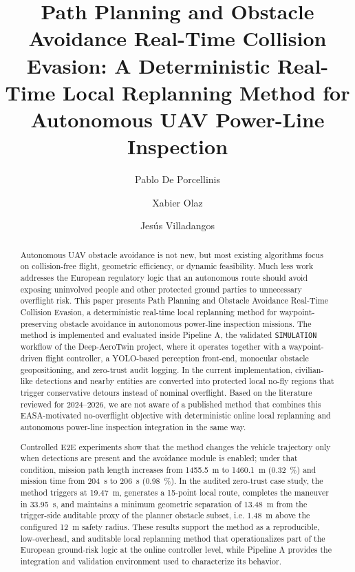 \documentclass[a4paper,11pt]{article}
\title{Path Planning and Obstacle Avoidance Real-Time Collision Evasion: A Deterministic Real-Time Local Replanning Method for Autonomous UAV Power-Line Inspection}
\author[1,2]{Pablo De Porcellinis}
\author[1]{Xabier Olaz}
\author[1,3]{Jes\'us Villadangos}
\affil[1]{Mathematical Engineering and Computer Science Department, Public University of Navarre, Spain}
\affil[2]{FuVeX Civil SL, Spain}
\affil[3]{Institute of Smart Cities, Public University of Navarre, Spain}
\date{}
\begin{document}
\maketitle

\begin{abstract}
Autonomous UAV obstacle avoidance is not new, but most existing algorithms focus on collision-free flight, geometric efficiency, or dynamic feasibility. Much less work addresses the European regulatory logic that an autonomous route should avoid exposing uninvolved people and other protected ground parties to unnecessary overflight risk. This paper presents Path Planning and Obstacle Avoidance Real-Time Collision Evasion, a deterministic real-time local replanning method for waypoint-preserving obstacle avoidance in autonomous power-line inspection missions. The method is implemented and evaluated inside Pipeline A, the validated \texttt{SIMULATION} workflow of the Deep-AeroTwin project, where it operates together with a waypoint-driven flight controller, a YOLO-based perception front-end, monocular obstacle geopositioning, and zero-trust audit logging. In the current implementation, civilian-like detections and nearby entities are converted into protected local no-fly regions that trigger conservative detours instead of nominal overflight. Based on the literature reviewed for 2024--2026, we are not aware of a published method that combines this EASA-motivated no-overflight objective with deterministic online local replanning and autonomous power-line inspection integration in the same way.

Controlled E2E experiments show that the method changes the vehicle trajectory only when detections are present and the avoidance module is enabled; under that condition, mission path length increases from \SI{1455.5}{\meter} to \SI{1460.1}{\meter} (\SI{0.32}{\percent}) and mission time from \SI{204}{\second} to \SI{206}{\second} (\SI{0.98}{\percent}). In the audited zero-trust case study, the method triggers at \SI{19.47}{\meter}, generates a 15-point local route, completes the maneuver in \SI{33.95}{\second}, and maintains a minimum geometric separation of \SI{13.48}{\meter} from the trigger-side auditable proxy of the planner obstacle subset, i.e. \SI{1.48}{\meter} above the configured \SI{12}{\meter} safety radius. These results support the method as a reproducible, low-overhead, and auditable local replanning method that operationalizes part of the European ground-risk logic at the online controller level, while Pipeline A provides the integration and validation environment used to characterize its behavior.
\end{abstract}
\end{document}
